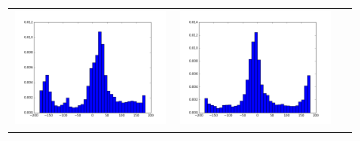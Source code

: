 \begin{tabular}{lll}
\includegraphics[width=4cm]{fig8/hist_341_t.png} &
\includegraphics[width=4cm]{fig8/hist_318_t.png}
\end{tabular}
